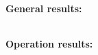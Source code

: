 \documentclass[landscape, a4paper,11pt]{article}
\begin{document}
	
	\bf{General results:}\\
	\begin{tiny}
		\begin{longtable}{ccccccc}
			
		\end{longtable}
	\end{tiny}
	\newpage
	
	\bf{Operation results:}\\
	\begin{tiny}
		\setlength\LTleft{-14mm}
		\begin{longtable}{ccccccccc}
			
		\end{longtable}
	\end{tiny}
	
\end{document}
